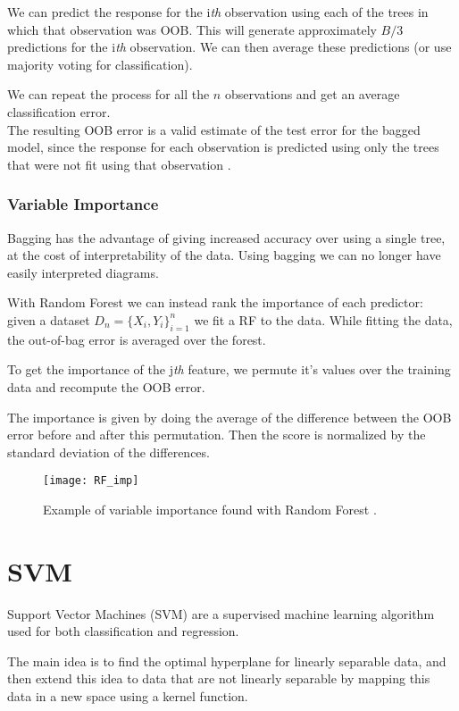 We can predict the response for the i\textit{th} observation using each of the trees in which that observation was OOB. This will generate approximately $B/3$ predictions for the i\textit{th} observation.
We can then average these predictions (or use majority voting for classification). 

We can repeat the process for all the $n$ observations and get an average classification error. \\
The resulting OOB error is a valid estimate of the test error for the bagged model, since the response for each observation is predicted using only the trees that were not fit using that observation \cite{ISLR}. 

\subsubsection{Variable Importance}
Bagging has the advantage of giving increased accuracy over using a single tree, at the cost of interpretability of the data. Using bagging we can no longer have easily interpreted diagrams.

With Random Forest we can instead rank the importance of each predictor: \\
given a dataset $D_n = \{X_i, Y_i\}_{i=1}^n$ we fit a RF to the data. While fitting the data, the out-of-bag error is averaged over the forest. 

To get the importance of the j\textit{th} feature, we permute it's values over the training data and recompute the OOB error.

The importance is given by doing the average of the difference between the OOB error before and after this permutation. Then the score is normalized by the standard deviation of the differences.

\begin{figure}[H]
	\centering
	\texttt{[image: RF\_imp]}
	\caption{Example of variable importance found with Random Forest \cite{rf_imp}.}
	\label{fig:RF_imp}
\end{figure}

\clearpage

\section{SVM} \label{svm}
Support Vector Machines (SVM) are a supervised machine learning algorithm used for both classification and regression.

The main idea is to find the optimal hyperplane for linearly separable data, and then extend this idea to data that are not linearly separable by mapping this data in a new space using a kernel function.

